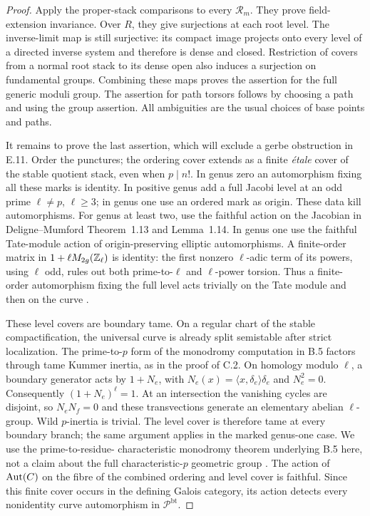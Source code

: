 \begin{proof}
Apply the proper-stack comparisons to every $\mathcal R_m$.
They prove field-extension invariance. Over $R$, they give
surjections at each root level. The inverse-limit map is still
surjective: its compact image projects onto every level of a
directed inverse system and therefore is dense and closed.
Restriction of covers from a normal root stack to its dense open
also induces a surjection on fundamental groups. Combining these
maps proves the assertion for the full generic moduli group.
The assertion for path torsors follows by choosing a path and
using the group assertion. All ambiguities are the usual choices
of base points and paths.

It remains to prove the last assertion, which will exclude a
gerbe obstruction in E.11. Order the punctures; the ordering cover
extends as a finite \emph{\'etale} cover of the stable quotient
stack, even when $p\mid n!$. In genus zero an automorphism fixing
all these marks is identity. In positive genus add a full Jacobi
level at an odd prime $\ell\ne p$, $\ell\geq3$; in genus one
use an ordered mark as origin. These data kill automorphisms.
For genus at least two, use the faithful action on the Jacobian
in Deligne--Mumford Theorem~1.13 and Lemma~1.14. In genus one
use the faithful Tate-module action of origin-preserving elliptic
automorphisms. A finite-order matrix in
$1+\ell M_{2g}(\mathbb Z_\ell)$ is identity: the first nonzero
$\ell$-adic term of its powers, using $\ell$ odd, rules out both
prime-to-$\ell$ and $\ell$-power torsion. Thus a finite-order
automorphism fixing the full level acts trivially on the Tate
module and then on the curve
\citep[Theorem~1.13, Lemma~1.14, and \S5.14]{BC_DM}.

These level covers are boundary tame. On a regular chart of
the stable compactification, the universal curve is already
split semistable after strict localization. The prime-to-$p$
form of the monodromy computation in B.5 factors through tame
Kummer inertia, as in the proof of C.2. On homology modulo
$\ell$, a boundary generator acts by $1+N_e$, with
$N_e(x)=\langle x,\delta_e\rangle\delta_e$ and $N_e^2=0$.
Consequently $(1+N_e)^\ell=1$. At an intersection the
vanishing cycles are disjoint, so $N_eN_f=0$ and these
transvections generate an elementary abelian $\ell$-group.
Wild $p$-inertia is trivial. The level cover is therefore
tame at every boundary branch; the same argument applies
in the marked genus-one case. We use the prime-to-residue-
characteristic monodromy theorem underlying B.5 here, not a
claim about the full characteristic-$p$ geometric group
\citep[Theorem~4.8, Lemma~5.4]{BC_HMTopics}.
The action of $\operatorname{Aut}(C)$ on the fibre of the combined ordering
and level cover is faithful. Since this finite cover occurs in
the defining Galois category, its action detects every nonidentity
curve automorphism in $\mathcal P^{\mathrm{bt}}$.
\end{proof}

